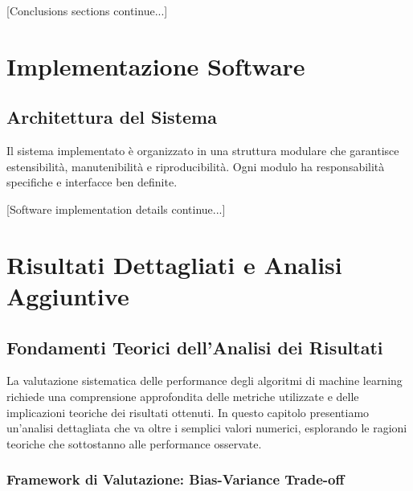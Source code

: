 \documentclass[12pt,a4paper,twoside]{report}
\begin{document}
[Conclusions sections continue...]





\begin{appendices}


\chapter{Implementazione Software}

\section{Architettura del Sistema}

Il sistema implementato è organizzato in una struttura modulare che garantisce estensibilità, manutenibilità e riproducibilità. Ogni modulo ha responsabilità specifiche e interfacce ben definite.

[Software implementation details continue...]


\chapter{Risultati Dettagliati e Analisi Aggiuntive}

\section{Fondamenti Teorici dell'Analisi dei Risultati}

La valutazione sistematica delle performance degli algoritmi di machine learning richiede una comprensione approfondita delle metriche utilizzate e delle implicazioni teoriche dei risultati ottenuti. In questo capitolo presentiamo un'analisi dettagliata che va oltre i semplici valori numerici, esplorando le ragioni teoriche che sottostanno alle performance osservate.

\subsection{Framework di Valutazione: Bias-Variance Trade-off}


\end{appendices}
\end{document}
